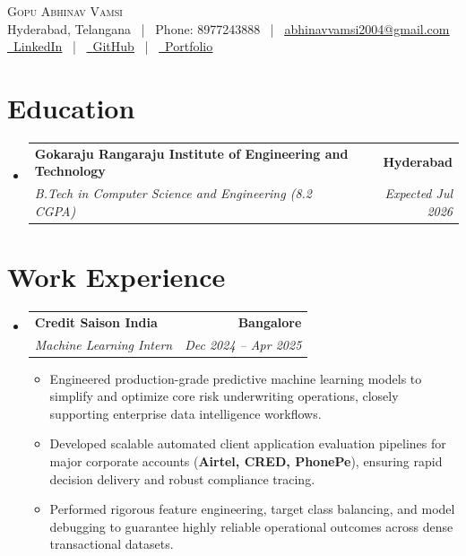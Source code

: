 \documentclass[letterpaper,11pt]{article}
\makeatletter
\newcommand{\resumeItem}[1]{
  \item\small{
    {#1 \vspace{-3pt}}
  }
}
\newcommand{\resumeSubheading}[4]{
  \vspace{-3pt}\item
    \begin{tabular*}{1.0\textwidth}[t]{l@{\extracolsep{\fill}}r}
      \textbf{#1} & \textbf{\small #2} \\
      \textit{\small#3} & \textit{\small #4} \\
    \end{tabular*}\vspace{-7pt}
}
\newcommand{\resumeSubHeadingListStart}{\begin{itemize}[leftmargin=0.0in, label={}]}
\newcommand{\resumeSubHeadingListEnd}{\end{itemize}}
\newcommand{\resumeItemListStart}{\begin{itemize}}
\newcommand{\resumeItemListEnd}{\end{itemize}\vspace{0pt}}
\makeatother
\begin{document}
    \begin{center}
        {\Huge\scshape Gopu Abhinav Vamsi} \\ \vspace{2pt}
        Hyderabad, Telangana ~|~ Phone: 8977243888 ~|~ \href{mailto:abhinavvamsi2004@gmail.com}{\underline{abhinavvamsi2004@gmail.com}} \\ \vspace{2pt}
        \small
        \href{https://www.linkedin.com/in/gopu-abhinav-vamsi-0211ab294/}{\faLinkedin\ \underline{LinkedIn}} ~|~
        \href{https://github.com/Abhinavvamsi}{\faGithub\ \underline{GitHub}} ~|~
        \href{https://abhinavvamsi.github.io/abhinav-portfolio/}{\faGlobe\ \underline{Portfolio}}
    \end{center}

\section{Education}
  \resumeSubHeadingListStart
    \resumeSubheading
      {Gokaraju Rangaraju Institute of Engineering and Technology}{Hyderabad}
      {B.Tech in Computer Science and Engineering (8.2 CGPA)}{Expected Jul 2026}
  \resumeSubHeadingListEnd

\section{Work Experience}
  \resumeSubHeadingListStart
    \resumeSubheading
      {Credit Saison India}{Bangalore}
      {Machine Learning Intern}{Dec 2024 -- Apr 2025}
      \resumeItemListStart
        \resumeItem{Engineered production-grade predictive machine learning models to simplify and optimize core risk underwriting operations, closely supporting enterprise data intelligence workflows.}
        \resumeItem{Developed scalable automated client application evaluation pipelines for major corporate accounts (\textbf{Airtel, CRED, PhonePe}), ensuring rapid decision delivery and robust compliance tracing.}
        \resumeItem{Performed rigorous feature engineering, target class balancing, and model debugging to guarantee highly reliable operational outcomes across dense transactional datasets.}
      \resumeItemListEnd
  \resumeSubHeadingListEnd

\end{document}
